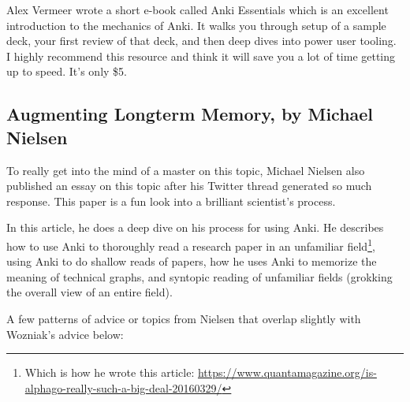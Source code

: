 \documentclass[]{tufte-handout}
\begin{document}
Alex Vermeer wrote a short e-book called Anki Essentials\cite{vermeer} which is an excellent introduction to the mechanics of Anki. It walks you through setup of a sample deck, your first review of that deck, and then deep dives into power user tooling. I highly recommend this resource and think it will save you a lot of time getting up to speed. It's only \$5.

\newpage

\subsection{Augmenting Longterm Memory, by Michael Nielsen}

To really get into the mind of a master on this topic, Michael Nielsen\cite{nielsen} also published an essay on this topic after his Twitter thread generated so much response. This paper is a fun look into a brilliant scientist's process.

In this article, he does a deep dive on his process for using Anki. He describes how to use Anki to thoroughly read a research paper in an unfamiliar field\footnote{Which is how he wrote this article: \url{https://www.quantamagazine.org/is-alphago-really-such-a-big-deal-20160329/}}, using Anki to do shallow reads of papers, how he uses Anki to memorize the meaning of technical graphs, and syntopic reading of unfamiliar fields (grokking the overall view of an entire field).

A few patterns of advice or topics from Nielsen that overlap slightly with Wozniak's advice below:
\end{document}
